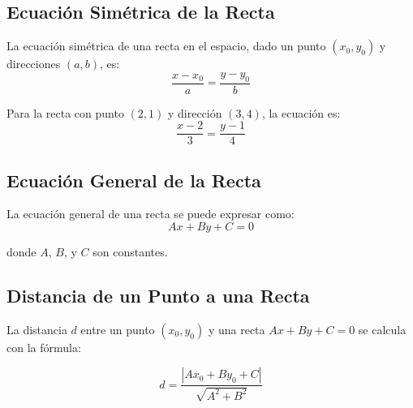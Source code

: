 \subsection{Ecuación Simétrica de la Recta}

La ecuación simétrica de una recta en el espacio, dado un punto \((x_0, y_0)\) y direcciones \((a, b)\), es:
\begin{equation}
    \frac{x - x_0}{a} = \frac{y - y_0}{b}
\end{equation}

\begin{example}
Para la recta con punto \((2, 1)\) y dirección \((3, 4)\), la ecuación es:
\[
\frac{x - 2}{3} = \frac{y - 1}{4}
\]
\begin{center}
\end{center}
\end{example}


\subsection{Ecuación General de la Recta}

La ecuación general de una recta se puede expresar como:
\begin{equation}
    Ax + By + C = 0
\end{equation}

donde \(A\), \(B\), y \(C\) son constantes.


\subsection{Distancia de un Punto a una Recta}

La distancia \(d\) entre un punto \((x_0, y_0)\) y una recta \(Ax + By + C = 0\) se calcula con la fórmula:

\[
d = \frac{|Ax_0 + By_0 + C|}{\sqrt{A^2 + B^2}}
\]

